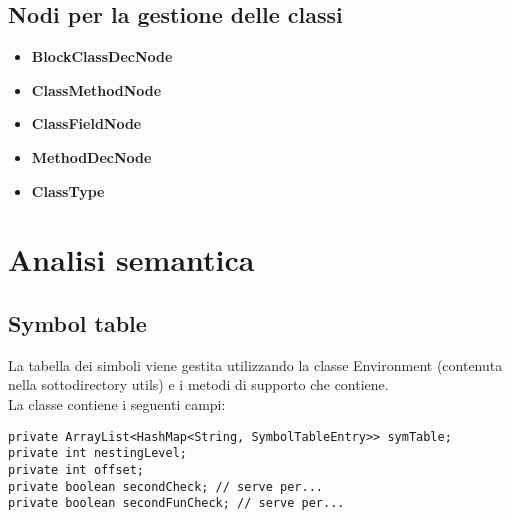 \documentclass[a4paper]{article}   %
\begin{document}
\subsection{Nodi per la gestione delle classi}
\begin{itemize}
  \item \textbf{BlockClassDecNode}
  \item \textbf{ClassMethodNode}
  \item \textbf{ClassFieldNode}
  \item \textbf{MethodDecNode}
  \item \textbf{ClassType}
\end{itemize}
\section{Analisi semantica}

\subsection{Symbol table}

La tabella dei simboli viene gestita utilizzando la classe Environment (contenuta nella sottodirectory utils)
e i metodi di supporto che contiene.\\
La classe contiene i seguenti campi:\\

\begin{lstlisting}
private ArrayList<HashMap<String, SymbolTableEntry>> symTable;
private int nestingLevel;
private int offset;
private boolean secondCheck; // serve per...
private boolean secondFunCheck; // serve per...
\end{lstlisting}
\end{document}
